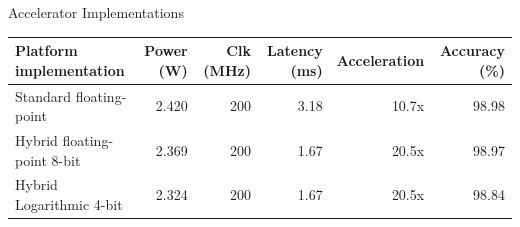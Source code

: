 \begin{frame}[shrink=30]{Accelerator Implementations} %
	\begin{center} %
		\begin{threeparttable}
			\caption{Accelerator implementations.} %
			\scriptsize %
			\begin{tabular}{lrrrrr}
				\toprule
				\textbf{Platform implementation} & \textbf{Power (W)} & \textbf{Clk (MHz)} & \textbf{Latency (ms)} & \textbf{Acceleration} & \textbf{Accuracy (\%)} \\
				\midrule
				Standard floating-point & 2.420 & 200 & 3.18 & 10.7x & 98.98 \\
				Hybrid floating-point 8-bit & 2.369 & 200 & 1.67 & 20.5x & 98.97 \\
				Hybrid Logarithmic 4-bit & 2.324 & 200 & 1.67 & 20.5x & 98.84 \\
				\bottomrule
			\end{tabular}
		\end{threeparttable}
	\end{center}
\end{frame}